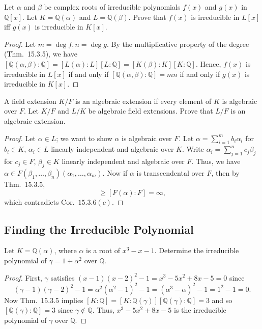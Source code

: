 \documentclass[12pt]{article}
\theoremstyle{remark}
\begin{document}
\setcounter{subsubsection}{8}
\begin{problem}
  Let $\alpha$ and $\beta$ be complex roots of irreducible polynomials $f(x)$ and $g(x)$ in $\mathbb{Q}[x]$. Let $K=\mathbb{Q}(\alpha)$ and $L=\mathbb{Q}(\beta)$. Prove that $f(x)$ is irreducible in $L[x]$ iff $g(x)$ is irreducible in $K[x]$.
\end{problem}
\begin{proof}
  Let $m = \deg f,n = \deg g$. By the multiplicative property of the degree (Thm.~15.3.5), we have $[\mathbb{Q}(\alpha,\beta) : \mathbb{Q}] = [L(\alpha) : L][L : \mathbb{Q}] = [K(\beta) : K][K : \mathbb{Q}]$.  Hence, $f(x)$ is irreducible in $L[x]$ if and only if $[\mathbb{Q}(\alpha,\beta) : \mathbb{Q}] = mn$ if and only if $g(x)$ is irreducible in $K[x]$.
\end{proof}

\begin{problem}\label{exc:15.3.10}
  A field extension $K/F$ is an algebraic extension if every element of $K$ is algebraic over $F$. Let $K/F$ and $L/K$ be algebraic field extensions. Prove that $L/F$ is an algebraic extension. 
\end{problem}
\begin{proof}
  Let $\alpha \in L$; we want to show $\alpha$ is algebraic over $F$. Let $\alpha = \sum_{i=1}^m b_i\alpha_i$ for $b_i \in K$, $\alpha_i \in L$ linearly independent and algebraic over $K$. Write $\alpha_i = \sum_{j=1}^n c_j\beta_j$ for $c_j \in F$, $\beta_j \in K$ linearly independent and algebraic over $F$. Thus, we have $\alpha \in F(\beta_1,\ldots,\beta_n)(\alpha_1,\ldots,\alpha_m)$. Now if $\alpha$ is transcendental over $F$, then by Thm.~15.3.5,
  \begin{equation*}
    [F(\beta_1,\ldots,\beta_n)(\alpha_1,\ldots,\alpha_m) : F(\beta_1,\ldots,\beta_n)][F(\beta_1,\ldots,\beta_n) : F] \ge [F(\alpha) : F] = \infty,
  \end{equation*}
  which contradicts Cor.~$15.3.6(c)$.
\end{proof}

\subsection{Finding the Irreducible Polynomial}
\begin{problem}
  Let $K=\mathbb{Q}(\alpha)$, where $\alpha$ is a root of $x^3-x-1$. Determine the irreducible polynomial of $\gamma=1+\alpha^2$ over $\mathbb{Q}$.
\end{problem}
\begin{proof}
  First, $\gamma$ satisfies $(x-1)(x-2)^2-1 = x^3 - 5x^2 + 8x - 5 = 0$ since
  \begin{equation*}
    (\gamma-1)(\gamma-2)^2 - 1 = \alpha^2(\alpha^2 - 1)^2 - 1 = (\alpha^3 - \alpha)^2 - 1 = 1^2 - 1 = 0.
  \end{equation*}
  Now Thm.~15.3.5 implies $[K : \mathbb{Q}] = [K : \mathbb{Q}(\gamma)][\mathbb{Q}(\gamma) : \mathbb{Q}] = 3$ and so $[\mathbb{Q}(\gamma) : \mathbb{Q}] = 3$ since $\gamma \notin \mathbb{Q}$. Thus, $x^3 - 5x^2 + 8x - 5$ is the irreducible polynomial of $\gamma$ over $\mathbb{Q}$.
\end{proof}
\end{document}
